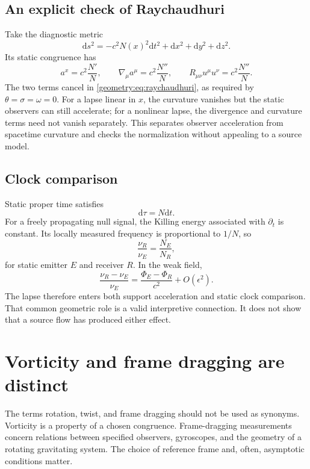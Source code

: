 \documentclass[11pt,oneside]{report}
\newcommand{\Ph}{\Phi}
\newcommand{\dd}{\mathrm d}
\theoremstyle{remark}
\numberwithin{definition}{chapter}
\numberwithin{proposition}{chapter}
\numberwithin{remark}{chapter}
\begin{document}
\subsection{An explicit check of Raychaudhuri}
Take the diagnostic metric
\begin{equation}
\dd s^2=-c^2N(x)^2\dd t^2+\dd x^2+\dd y^2+\dd z^2.
\end{equation}
Its static congruence has
\begin{equation}
a^x=c^2\frac{N'}{N},\qquad
\nabla_\mu a^\mu=c^2\frac{N''}{N},\qquad
R_{\mu\nu}u^\mu u^\nu=c^2\frac{N''}{N}.
\end{equation}
The two terms cancel in \eqref{geometry:eq:raychaudhuri}, as required by $\theta=\sigma=\omega=0$. For a lapse linear in $x$, the curvature vanishes but the static observers can still accelerate; for a nonlinear lapse, the divergence and curvature terms need not vanish separately. This separates observer acceleration from spacetime curvature and checks the normalization without appealing to a source model.

\subsection{Clock comparison}
Static proper time satisfies
\begin{equation}
\dd\tau=N\dd t.
\label{geometry:eq:stationarytime}
\end{equation}
For a freely propagating null signal, the Killing energy associated with $\partial_t$ is constant. Its locally measured frequency is proportional to $1/N$, so
\begin{equation}
\frac{\nu_R}{\nu_E}=\frac{N_E}{N_R},
\label{geometry:eq:redshift}
\end{equation}
for static emitter $E$ and receiver $R$. In the weak field,
\begin{equation}
\frac{\nu_R-\nu_E}{\nu_E}=\frac{\Ph_E-\Ph_R}{c^2}+O(\epsilon^2).
\label{geometry:eq:redshiftweakfield}
\end{equation}
The lapse therefore enters both support acceleration and static clock comparison. That common geometric role is a valid interpretive connection. It does not show that a source flow has produced either effect.

\section{Vorticity and frame dragging are distinct}
The terms rotation, twist, and frame dragging should not be used as synonyms. Vorticity is a property of a chosen congruence. Frame-dragging measurements concern relations between specified observers, gyroscopes, and the geometry of a rotating gravitating system. The choice of reference frame and, often, asymptotic conditions matter.
\end{document}
